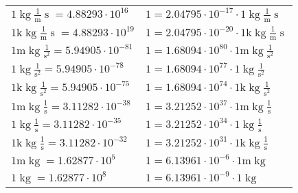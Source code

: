 \begin{center}
\begin{longtable}{l l}
{\color{black}$1 \bm{\mathrm{ }}\operatorname{kg}\frac1{\operatorname{m}}{\operatorname{s}}{}{} = 4.88293\cdot10^{16} $}   & {\color{black}$ 1 = 2.04795\cdot10^{-17} \cdot 1 \bm{\mathrm{ }}\operatorname{kg}\frac1{\operatorname{m}}{\operatorname{s}}{}{}$}  \\
{\color{gray}$1 \bm{\mathrm{ k}}\operatorname{kg}\frac1{\operatorname{m}}{\operatorname{s}}{}{} = 4.88293\cdot10^{19} $}   & {\color{gray}$ 1 = 2.04795\cdot10^{-20} \cdot 1 \bm{\mathrm{ k}}\operatorname{kg}\frac1{\operatorname{m}}{\operatorname{s}}{}{}$}  \\
{\color{gray}$1 \bm{\mathrm{ m}}\operatorname{kg}{}\frac1{\operatorname{s}^2}{}{} = 5.94905\cdot10^{-81} $}   & {\color{gray}$ 1 = 1.68094\cdot10^{80} \cdot 1 \bm{\mathrm{ m}}\operatorname{kg}{}\frac1{\operatorname{s}^2}{}{}$}  \\
{\color{black}$1 \bm{\mathrm{ }}\operatorname{kg}{}\frac1{\operatorname{s}^2}{}{} = 5.94905\cdot10^{-78} $}   & {\color{black}$ 1 = 1.68094\cdot10^{77} \cdot 1 \bm{\mathrm{ }}\operatorname{kg}{}\frac1{\operatorname{s}^2}{}{}$}  \\
{\color{gray}$1 \bm{\mathrm{ k}}\operatorname{kg}{}\frac1{\operatorname{s}^2}{}{} = 5.94905\cdot10^{-75} $}   & {\color{gray}$ 1 = 1.68094\cdot10^{74} \cdot 1 \bm{\mathrm{ k}}\operatorname{kg}{}\frac1{\operatorname{s}^2}{}{}$}  \\
{\color{gray}$1 \bm{\mathrm{ m}}\operatorname{kg}{}\frac1{\operatorname{s}}{}{} = 3.11282\cdot10^{-38} $}   & {\color{gray}$ 1 = 3.21252\cdot10^{37} \cdot 1 \bm{\mathrm{ m}}\operatorname{kg}{}\frac1{\operatorname{s}}{}{}$}  \\
{\color{black}$1 \bm{\mathrm{ }}\operatorname{kg}{}\frac1{\operatorname{s}}{}{} = 3.11282\cdot10^{-35} $}   & {\color{black}$ 1 = 3.21252\cdot10^{34} \cdot 1 \bm{\mathrm{ }}\operatorname{kg}{}\frac1{\operatorname{s}}{}{}$}  \\
{\color{gray}$1 \bm{\mathrm{ k}}\operatorname{kg}{}\frac1{\operatorname{s}}{}{} = 3.11282\cdot10^{-32} $}   & {\color{gray}$ 1 = 3.21252\cdot10^{31} \cdot 1 \bm{\mathrm{ k}}\operatorname{kg}{}\frac1{\operatorname{s}}{}{}$}  \\
{\color{gray}$1 \bm{\mathrm{ m}}\operatorname{kg}{}{}{}{} = 1.62877\cdot10^{5} $}   & {\color{gray}$ 1 = 6.13961\cdot10^{-6} \cdot 1 \bm{\mathrm{ m}}\operatorname{kg}{}{}{}{}$}  \\
{\color{black}$1 \bm{\mathrm{ }}\operatorname{kg}{}{}{}{} = 1.62877\cdot10^{8} $}   & {\color{black}$ 1 = 6.13961\cdot10^{-9} \cdot 1 \bm{\mathrm{ }}\operatorname{kg}{}{}{}{}$}  \\

\end{longtable}
\end{center}
